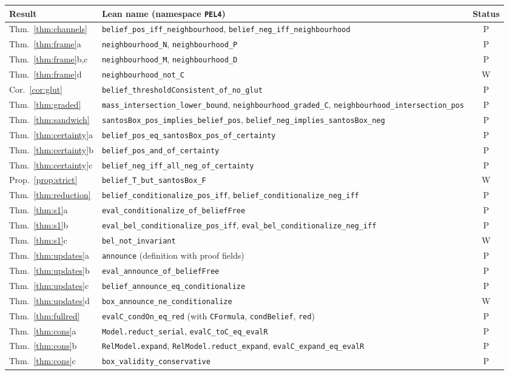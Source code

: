 \documentclass[11pt,a4paper]{article}
\theoremstyle{definition}
\theoremstyle{remark}
\newcommand{\lean}[1]{\texttt{\small #1}}
\begin{document}
\medskip
{\footnotesize\renewcommand{\lean}[1]{\texttt{#1}}\noindent\begin{tabular}{@{}l>{\raggedright\arraybackslash}p{}c@{}}
\toprule
Result & Lean name (namespace \lean{PEL4}) & Status\\
\midrule
Thm.~\ref{thm:channels} & \lean{belief\_pos\_iff\_neighbourhood}, \lean{belief\_neg\_iff\_neighbourhood} & P\\
Thm.~\ref{thm:frame}a & \lean{neighbourhood\_N}, \lean{neighbourhood\_P} & P\\
Thm.~\ref{thm:frame}b,c & \lean{neighbourhood\_M}, \lean{neighbourhood\_D} & P\\
Thm.~\ref{thm:frame}d & \lean{neighbourhood\_not\_C} & W\\
Cor.~\ref{cor:glut} & \lean{belief\_thresholdConsistent\_of\_no\_glut} & P\\
Thm.~\ref{thm:graded} & \lean{mass\_intersection\_lower\_bound}, \lean{neighbourhood\_graded\_C}, \lean{neighbourhood\_intersection\_pos} & P\\
Thm.~\ref{thm:sandwich} & \lean{santosBox\_pos\_implies\_belief\_pos}, \lean{belief\_neg\_implies\_santosBox\_neg} & P\\
Thm.~\ref{thm:certainty}a & \lean{belief\_pos\_eq\_santosBox\_pos\_of\_certainty} & P\\
Thm.~\ref{thm:certainty}b & \lean{belief\_pos\_and\_of\_certainty} & P\\
Thm.~\ref{thm:certainty}c & \lean{belief\_neg\_iff\_all\_neg\_of\_certainty} & P\\
Prop.~\ref{prop:strict} & \lean{belief\_T\_but\_santosBox\_F} & W\\
Thm.~\ref{thm:reduction} & \lean{belief\_conditionalize\_pos\_iff}, \lean{belief\_conditionalize\_neg\_iff} & P\\
Thm.~\ref{thm:s1}a & \lean{eval\_conditionalize\_of\_beliefFree} & P\\
Thm.~\ref{thm:s1}b & \lean{eval\_bel\_conditionalize\_pos\_iff}, \lean{eval\_bel\_conditionalize\_neg\_iff} & P\\
Thm.~\ref{thm:s1}c & \lean{bel\_not\_invariant} & W\\
Thm.~\ref{thm:updates}a & \lean{announce} (definition with proof fields) & P\\
Thm.~\ref{thm:updates}b & \lean{eval\_announce\_of\_beliefFree} & P\\
Thm.~\ref{thm:updates}c & \lean{belief\_announce\_eq\_conditionalize} & P\\
Thm.~\ref{thm:updates}d & \lean{box\_announce\_ne\_conditionalize} & W\\
Thm.~\ref{thm:fullred} & \lean{evalC\_condOn\_eq\_red} (with \lean{CFormula}, \lean{condBelief}, \lean{red}) & P\\
Thm.~\ref{thm:cons}a & \lean{Model.reduct\_serial}, \lean{evalC\_toC\_eq\_evalR} & P\\
Thm.~\ref{thm:cons}b & \lean{RelModel.expand}, \lean{RelModel.reduct\_expand}, \lean{evalC\_expand\_eq\_evalR} & P\\
Thm.~\ref{thm:cons}c & \lean{box\_validity\_conservative} & P\\
\bottomrule
\end{tabular}}
\end{document}
